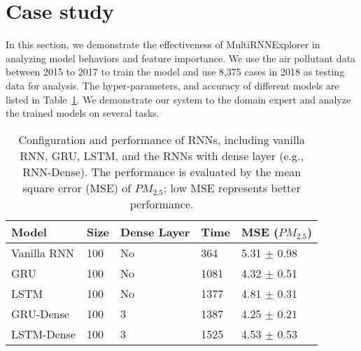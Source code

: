 \section{Case study}

In this section, we demonstrate the effectiveness of MultiRNNExplorer in analyzing model behaviors and feature importance. 
We use the air pollutant data between 2015 to 2017 to train the model and use 8,375 cases in 2018 as testing data for analysis. 
The hyper-parameters,  and accuracy of different models are listed in Table~\ref{table:model_configuration}. 
We demonstrate our system to the domain expert and analyze the trained models on several tasks.

\begin{table}[h!]
\centering
\caption{Configuration and performance of RNNs, including vanilla RNN, GRU, LSTM, and the RNNs with dense layer (e.g., RNN-Dense). The performance is evaluated by the mean square error (MSE) of $PM_{2.5}$; low MSE represents better performance.}
\begin{tabular}{p{1.8cm}|p{0.5cm}|p{1.7cm}|p{0.5cm}|p{1.7cm}} 
 \hline
 Model & Size & Dense Layer & Time & MSE ($PM_{2.5}$) \\ [0.5ex] 
 \hline
    Vanilla RNN&100&No&364&5.31 $\pm$ 0.98 \\
    GRU&100&No&1081&4.32 $\pm$ 0.51\\
    LSTM&100&No&1377&4.81 $\pm$ 0.31\\
    GRU-Dense&100&3&1387&4.25 $\pm$ 0.21\\
    LSTM-Dense&100&3&1525&4.53 $\pm$ 0.53\\
\hline
\end{tabular}
\vspace{-15px}
\label{table:model_configuration}
\vspace{-5px}
\end{table}















